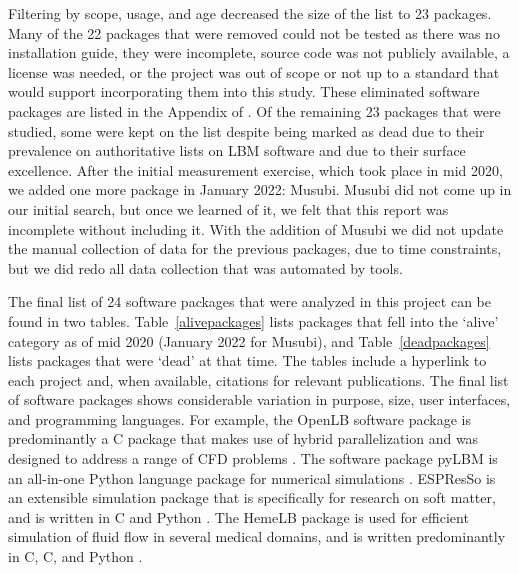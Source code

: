 \documentclass[final, 3p, times, authoryear]{elsarticle}
\newcommand{\CC}{C\nolinebreak\hspace{-.05em}\raisebox{.4ex}{\small\bf
+}\nolinebreak\hspace{-.10em}\raisebox{.4ex}{\small\bf +}}
\begin{document}
Filtering by scope, usage, and age decreased the size of the list to 23
packages. Many of the 22 packages that were removed could not be tested as there
was no installation guide, they were incomplete, source code was not publicly
available, a license was needed, or the project was out of scope or not up to a
standard that would support incorporating them into this study. These eliminated
software packages are listed in the Appendix of \citet{Michalski2021}. Of the
remaining 23 packages that were studied, some were kept on the list despite
being marked as dead due to their prevalence on authoritative lists on LBM
software and due to their surface excellence.  After the initial measurement
exercise, which took place in mid 2020, we added one more package in January
2022: Musubi.  Musubi did not come up in our initial search, but once we learned
of it, we felt that this report was incomplete without including it.  With the
addition of Musubi we did not update the manual collection of data for the
previous packages, due to time constraints, but we did redo all data collection
that was automated by tools.

The final list of 24 software packages that were analyzed in this project can be
found in two tables. Table~\ref{alivepackages} lists packages that fell into the
`alive' category as of mid 2020 (January 2022 for Musubi), and
Table~\ref{deadpackages} lists packages that were `dead' at that time. The
tables include a hyperlink to each project and, when available, citations for
relevant publications.  The final list of software packages shows considerable
variation in purpose, size, user interfaces, and programming languages. For
example, the OpenLB software package is predominantly a \CC{} package that makes
use of hybrid parallelization and was designed to address a range of CFD
problems \citep{heuveline2009towards}. The software package pyLBM is an
all-in-one Python language package for numerical simulations
\citep{graille2017pylbm}. ESPResSo is an extensible simulation package that is
specifically for research on soft matter, and is written in \CC{} and Python
\citep{weik2019espresso}. The HemeLB package is used for efficient simulation of
fluid flow in several medical domains, and is written predominantly in C, \CC,
and Python \citep{mazzeo2008hemelb}.
\end{document}
